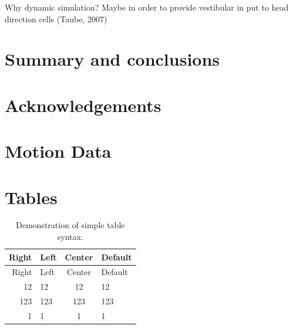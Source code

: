 \documentclass[english,floatsintext,man]{apa6}
\theoremstyle{definition}
\theoremstyle{definition}
\theoremstyle{remark}
\begin{document}
Why dynamic simulation? Maybe in order to provide vestibular in put to
head direction cells (Taube, 2007)

\section{Summary and conclusions}\label{summary-and-conclusions}

\section{Acknowledgements}\label{acknowledgements}

\section{Motion Data}\label{motion-data}

\section{Tables}\label{tables}

\begin{longtable}[]{@{}rlcl@{}}
\caption{Demonstration of simple table syntax.}\tabularnewline
\toprule
Right & Left & Center & Default\tabularnewline
\midrule
\endfirsthead
\toprule
Right & Left & Center & Default\tabularnewline
\midrule
\endhead
12 & 12 & 12 & 12\tabularnewline
123 & 123 & 123 & 123\tabularnewline
1 & 1 & 1 & 1\tabularnewline
\bottomrule
\end{longtable}
\end{document}
